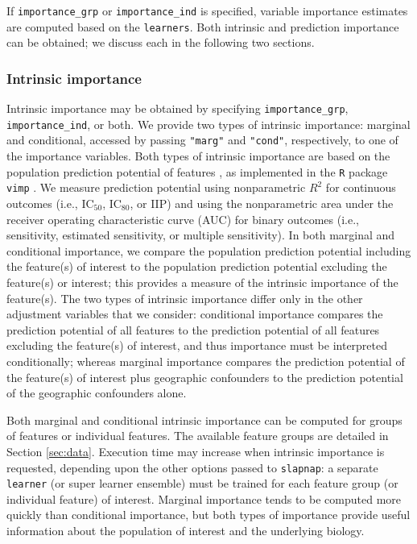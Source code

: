 \documentclass[]{article}
\begin{document}
If \texttt{importance\_grp} or \texttt{importance\_ind} is specified,
variable importance estimates are computed based on the
\texttt{learners}. Both intrinsic and prediction importance can be
obtained; we discuss each in the following two sections.

\subsubsection{Intrinsic importance}\label{sec:biolimp}

Intrinsic importance may be obtained by specifying
\texttt{importance\_grp}, \texttt{importance\_ind}, or both. We provide
two types of intrinsic importance: marginal and conditional, accessed by
passing \texttt{"marg"} and \texttt{"cond"}, respectively, to one of the
importance variables. Both types of intrinsic importance are based on
the population prediction potential of features \citep{williamson2020},
as implemented in the \texttt{R} package \texttt{vimp} \citep{vimppkg}.
We measure prediction potential using nonparametric \(R^2\) for
continuous outcomes (i.e., IC\(_{50}\), IC\(_{80}\), or IIP) and using
the nonparametric area under the receiver operating characteristic curve
(AUC) for binary outcomes (i.e., sensitivity, estimated sensitivity, or
multiple sensitivity). In both marginal and conditional importance, we
compare the population prediction potential including the feature(s) of
interest to the population prediction potential excluding the feature(s)
or interest; this provides a measure of the intrinsic importance of the
feature(s). The two types of intrinsic importance differ only in the
other adjustment variables that we consider: conditional importance
compares the prediction potential of all features to the prediction
potential of all features excluding the feature(s) of interest, and thus
importance must be interpreted conditionally; whereas marginal
importance compares the prediction potential of the feature(s) of
interest plus geographic confounders to the prediction potential of the
geographic confounders alone.

Both marginal and conditional intrinsic importance can be computed for
groups of features or individual features. The available feature groups
are detailed in Section \ref{sec:data}. Execution time may increase when
intrinsic importance is requested, depending upon the other options
passed to \texttt{slapnap}: a separate \texttt{learner} (or super
learner ensemble) must be trained for each feature group (or individual
feature) of interest. Marginal importance tends to be computed more
quickly than conditional importance, but both types of importance
provide useful information about the population of interest and the
underlying biology.
\end{document}
